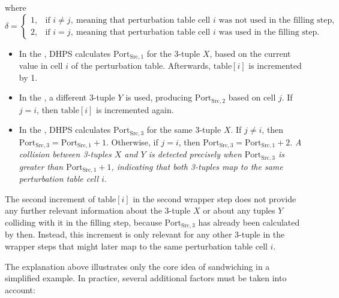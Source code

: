 \documentclass{report}
\begin{document}
\vspace{0.5em}

where
\[
\delta =
\begin{cases}
1, & \text{if } i \neq j,\ \text{meaning that perturbation table cell } i \text{ was not used in the filling step,} \\
2, & \text{if } i = j,\ \text{meaning that perturbation table cell } i \text{ was used in the filling step.}
\end{cases}
\]

\begin{itemize}
    \item In the , DHPS calculates \(\text{Port}_{\text{Src},1}\) for the 3-tuple \( X \), based on the current value in cell \( i \) of the perturbation table. Afterwards, \(\text{table}[i]\) is incremented by 1.
    \item In the , a different 3-tuple \( Y \) is used, producing \(\text{Port}_{\text{Src},2}\) based on cell \( j \). If \( j = i \), then \(\text{table}[i]\) is incremented again.
    \item In the , DHPS calculates \(\text{Port}_{\text{Src},3}\) for the same 3-tuple \( X \). If \( j \neq i \), then \(\text{Port}_{\text{Src},3} = \text{Port}_{\text{Src},1} + 1\). Otherwise, if \( j = i \), then \(\text{Port}_{\text{Src},3} = \text{Port}_{\text{Src},1} + 2\). \textit{A collision between 3-tuples \( X \) and \( Y \) is detected precisely when \(\text{Port}_{\text{Src},3}\) is greater than \(\text{Port}_{\text{Src},1} + 1\), indicating that both 3-tuples map to the same perturbation table cell \( i \)}.
\end{itemize}

\begin{sidenote}
  The second increment of \(\text{table}[i]\) in the second wrapper step does \alert{not provide any further relevant information} about the 3-tuple \( X \) or about any tuples \( Y \) colliding with it in the filling step, because \(\text{Port}_{\text{Src},3}\) has already been calculated by then. Instead, this increment is only relevant for any other 3-tuple in the wrapper steps that might later map to the same perturbation table cell \( i \).
\end{sidenote}

The explanation above illustrates only the \alert{core idea of sandwiching} in a simplified example. In practice, several additional factors must be taken into account:
\end{document}
